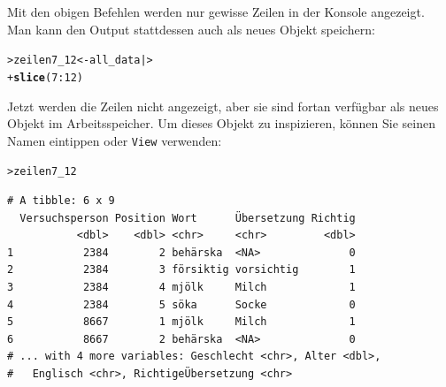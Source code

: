 \documentclass[oneside, 10pt]{book}\usepackage[]{graphicx}\usepackage[]{xcolor}
\makeatletter
\newcommand{\hlnum}[1]{\textcolor[rgb]{0.686,0.059,0.569}{#1}}%
\newcommand{\hlopt}[1]{\textcolor[rgb]{0,0,0}{#1}}%
\newcommand{\hlstd}[1]{\textcolor[rgb]{0.345,0.345,0.345}{#1}}%
\newcommand{\hlkwb}[1]{\textcolor[rgb]{0.69,0.353,0.396}{#1}}%
\newcommand{\hlkwd}[1]{\textcolor[rgb]{0.737,0.353,0.396}{\textbf{#1}}}%
\newenvironment{kframe}{%
 \def\at@end@of@kframe{}%
 \ifinner\ifhmode%
  \def\at@end@of@kframe{\end{minipage}}%
  \begin{minipage}{\columnwidth}%
 \fi\fi%
 \def\FrameCommand##1{\hskip\@totalleftmargin \hskip-\fboxsep
 \colorbox{shadecolor}{##1}\hskip-\fboxsep
     \hskip-\linewidth \hskip-\@totalleftmargin \hskip\columnwidth}%
 \MakeFramed {\advance\hsize-\width
   \@totalleftmargin\z@ \linewidth\hsize
   \@setminipage}}%
 {\par\unskip\endMakeFramed%
 \at@end@of@kframe}
\newenvironment{knitrout}{}{} %
\makeatother
\begin{document}
Mit den obigen Befehlen werden nur gewisse Zeilen in der Konsole angezeigt.
Man kann den Output stattdessen auch als neues Objekt speichern:
\begin{knitrout}
\color{fgcolor}\begin{kframe}
\begin{alltt}
\hlstd{> }\hlstd{zeilen7_12} \hlkwb{<-} \hlstd{all_data |>}
\hlstd{+ }  \hlkwd{slice}\hlstd{(}\hlnum{7}\hlopt{:}\hlnum{12}\hlstd{)}
\end{alltt}
\end{kframe}
\end{knitrout}

Jetzt werden die Zeilen nicht angezeigt, aber sie sind fortan verfügbar als neues Objekt
im Arbeitsspeicher. Um dieses Objekt zu inspizieren, können Sie seinen Namen eintippen
oder \texttt{View} verwenden:
\begin{knitrout}
\color{fgcolor}\begin{kframe}
\begin{alltt}
\hlstd{> }\hlstd{zeilen7_12}
\end{alltt}
\begin{verbatim}
# A tibble: 6 x 9
  Versuchsperson Position Wort      Übersetzung Richtig
           <dbl>    <dbl> <chr>     <chr>         <dbl>
1           2384        2 behärska  <NA>              0
2           2384        3 försiktig vorsichtig        1
3           2384        4 mjölk     Milch             1
4           2384        5 söka      Socke             0
5           8667        1 mjölk     Milch             1
6           8667        2 behärska  <NA>              0
# ... with 4 more variables: Geschlecht <chr>, Alter <dbl>,
#   Englisch <chr>, RichtigeÜbersetzung <chr>
\end{verbatim}
\end{kframe}
\end{knitrout}
\end{document}
